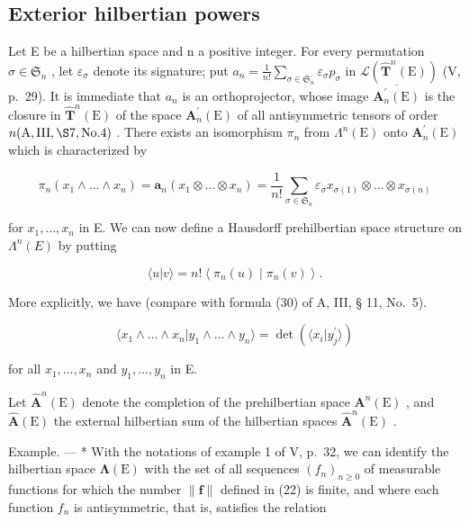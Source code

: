 \subsection{Exterior hilbertian powers}

Let E be a hilbertian space and n a positive integer. For every permutation \(\sigma\in\mathfrak{S}_{n}\) , let \(\varepsilon_{\sigma}\) denote its signature; put \(a_{n}=\frac{1}{n!}\sum_{\sigma\in\mathfrak{S}_{n}}\varepsilon_{\sigma}p_{\sigma}\) in \(\mathcal{L}(\hat{\mathbf{T}}^{n}(\mathrm{E}))\) (V, p.~29). It is immediate that \(a_{n}\) is an orthoprojector, whose image \(\overline{\mathbf{A}_{n}^{\prime}(\mathrm{E})}\) is the closure in \(\hat{\mathbf{T}}^{n}(\mathrm{E})\) of the space \(\mathbf{A}_{n}^{\prime}(\mathrm{E})\) of all antisymmetric tensors of order \(n(\mathrm{A},\mathrm{III},\S7,\mathrm{No}.4)\) . There exists an isomorphism \(\pi_{n}\) from \(\Lambda^{n}(\mathrm{E})\) onto \(\mathbf{A}_{n}^{\prime}(\mathrm{E})\) which is characterized by

\[
\pi_ {n} (x _ {1} \wedge \ldots \wedge x _ {n}) = \mathbf {a} _ {n} (x _ {1} \otimes \ldots \otimes x _ {n}) = \frac {1}{n !} \sum_ {\sigma \in \mathfrak {S} _ {n}} \varepsilon_ {\sigma} x _ {\sigma (1)} \otimes \ldots \otimes x _ {\sigma (n)}\tag{24}
\]

for \(x_{1}, \ldots, x_{n}\) in E. We can now define a Hausdorff prehilbertian space structure on \(\Lambda^{n}(E)\) by putting

\[
\langle u | v \rangle = n! \left\langle \pi_ {n} (u) \mid \pi_ {n} (v) \right\rangle .\tag{25}
\]

More explicitly, we have (compare with formula (30) of A, III, § 11, No.~5).

\[
\langle x _ {1} \wedge \dots \wedge x _ {n} | y _ {1} \wedge \dots \wedge y _ {n} \rangle = \det (\langle x _ {i} | y _ {j} ^ {\prime} \rangle)\tag{26}
\]

for all \(x_{1},\ldots ,x_{n}\) and \(y_{1},\ldots ,y_{n}\) in E.

Let \(\hat{\mathbf{A}}^n (\mathrm{E})\) denote the completion of the prehilbertian space \(\mathbf{A}^n (\mathrm{E})\) , and \(\hat{\mathbf{A}} (\mathrm{E})\) the external hilbertian sum of the hilbertian spaces \(\hat{\mathbf{A}}^n (\mathrm{E})\) .

Example. --- * With the notations of example 1 of V, p.~32, we can identify the hilbertian space \(\symbf{\Lambda}(\mathrm{E})\) with the set of all sequences \((f_n)_{n\geqslant 0}\) of measurable functions for which the number \(\| \mathbf{f}\|\) defined in (22) is finite, and where each function \(f_{n}\) is antisymmetric, that is, satisfies the relation

